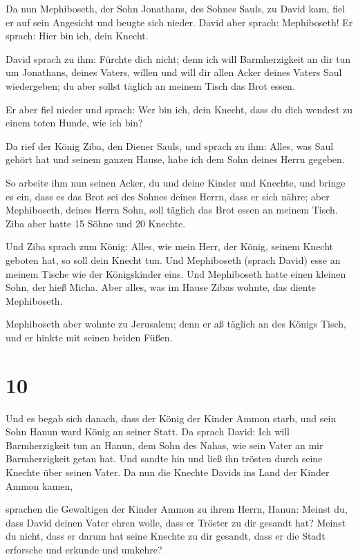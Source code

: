  Da nun Mephiboseth, der Sohn Jonathans, des Sohnes Sauls,
zu David kam, fiel er auf sein Angesicht und beugte sich nieder. David
aber sprach: Mephiboseth! Er sprach: Hier bin ich, dein Knecht.

 David sprach zu ihm: Fürchte dich nicht; denn ich will
Barmherzigkeit an dir tun um Jonathans, deines Vaters, willen und will
dir allen Acker deines Vaters Saul wiedergeben; du aber sollst täglich
an meinem Tisch das Brot essen.

 Er aber fiel nieder und sprach: Wer bin ich, dein Knecht,
dass du dich wendest zu einem toten Hunde, wie ich bin?

 Da rief der König Ziba, den Diener Sauls, und sprach zu
ihm: Alles, was Saul gehört hat und seinem ganzen Hause, habe ich dem
Sohn deines Herrn gegeben.

 So arbeite ihm nun seinen Acker, du und deine Kinder und
Knechte, und bringe es ein, dass es das Brot sei des Sohnes deines
Herrn, dass er sich nähre; aber Mephiboseth, deines Herrn Sohn, soll
täglich das Brot essen an meinem Tisch. Ziba aber hatte 15 Söhne und 20
Knechte.

 Und Ziba sprach zum König: Alles, wie mein Herr, der
König, seinem Knecht geboten hat, so soll dein Knecht tun. Und
Mephiboseth (sprach David) esse an meinem Tische wie der Königskinder
eins.  Und Mephiboseth hatte einen kleinen Sohn, der hieß
Micha. Aber alles, was im Hause Zibas wohnte, das diente Mephiboseth.

 Mephiboseth aber wohnte zu Jerusalem; denn er aß täglich
an des Königs Tisch, und er hinkte mit seinen beiden Füßen.

\hypertarget{section-9}{%
\section{10}\label{section-9}}

 Und es begab sich danach, dass der König der Kinder Ammon
starb, und sein Sohn Hanun ward König an seiner Statt.  Da
sprach David: Ich will Barmherzigkeit tun an Hanun, dem Sohn des Nahas,
wie sein Vater an mir Barmherzigkeit getan hat. Und sandte hin und ließ
ihn trösten durch seine Knechte über seinen Vater. Da nun die Knechte
Davids ins Land der Kinder Ammon kamen,

 sprachen die Gewaltigen der Kinder Ammon zu ihrem Herrn,
Hanun: Meinst du, dass David deinen Vater ehren wolle, dass er Tröster
zu dir gesandt hat? Meinst du nicht, dass er darum hat seine Knechte zu
dir gesandt, dass er die Stadt erforsche und erkunde und umkehre?

